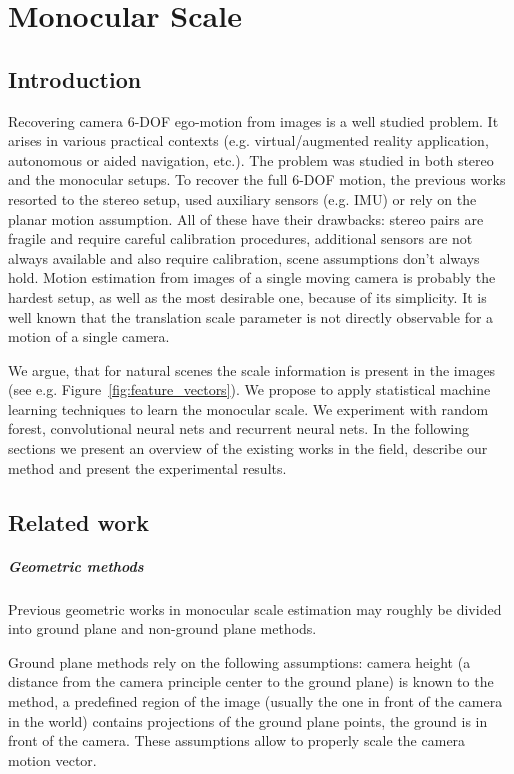 \chapter{Monocular Scale}

\section{Introduction}

Recovering camera 6-DOF ego-motion from images is a well studied
problem. It arises in various practical contexts
(e.g. virtual/augmented reality application, autonomous or aided
navigation, etc.).  The problem was studied in both stereo and the
monocular setups.  To recover the full 6-DOF motion, the previous
works resorted to the stereo setup, used auxiliary sensors (e.g. IMU)
or rely on the planar motion assumption.  All of these have their
drawbacks: stereo pairs are fragile and require careful calibration
procedures, additional sensors are not always available and also
require calibration, scene assumptions don't always hold.  Motion
estimation from images of a single moving camera is probably the
hardest setup, as well as the most desirable one, because of its
simplicity.  It is well known that the translation scale parameter is
not directly observable for a motion of a single camera.

We argue, that for natural scenes the scale information is present in
the images (see e.g. Figure~\ref{fig:feature_vectors}).  We propose to
apply statistical machine learning techniques to learn the monocular
scale.  We experiment with random forest, convolutional neural nets
and recurrent neural nets. In the following sections we present an
overview of the existing works in the field, describe our method and
present the experimental results.

\section{Related work}
\paragraph{Geometric methods} Previous geometric works in monocular
scale estimation may roughly be divided into ground plane and
non-ground plane methods.

Ground plane methods rely on the following assumptions: camera height
(a distance from the camera principle center to the ground plane) is
known to the method, a predefined region of the image (usually the one
in front of the camera in the world) contains projections of the
ground plane points, the ground is in front of the camera.  These
assumptions allow to properly scale the camera motion vector.

